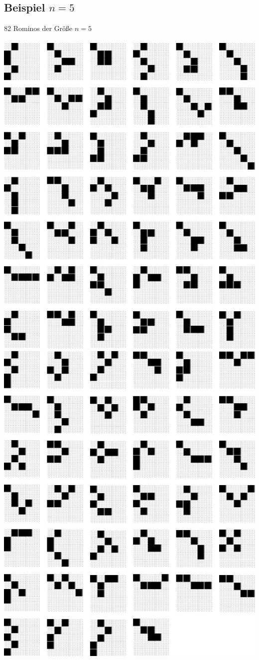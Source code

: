 \documentclass[a4paper,10pt]{scrartcl}
\begin{document}
\subsection{Beispiel \(n=5\)}
82 Rominos der Größe \(n=5\) \\\\
\includegraphics{5a.jpg} \\
\includegraphics{5b.jpg}
\end{document}
